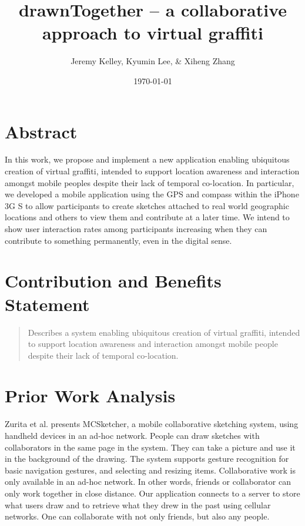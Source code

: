 \documentclass{article}
\begin{document}
\setlength{\parindent}{0pt}
\setlength{\parskip}{.5ex plus 0.5ex minus 0.2ex}




\title{ drawnTogether -- a collaborative approach to virtual graffiti }

\author{ Jeremy Kelley, Kyumin Lee, \& Xiheng Zhang }

\date{\today}

\maketitle

\section{ Abstract }

In this work, we propose and implement a new application enabling ubiquitous
creation of virtual graffiti, intended to support location awareness and
interaction amongst mobile peoples despite their lack of temporal co-location.
In particular, we developed a mobile application using the GPS and compass
within the iPhone 3G S to allow participants to create sketches attached to
real world geographic locations and others to view them and contribute at a
later time.  We intend to show user interaction rates among participants
increasing when they can contribute to something permanently, even in the
digital sense.

\section{ Contribution and Benefits Statement }

\begin{quote}
Describes a system enabling ubiquitous creation of virtual graffiti, intended
to support location awareness and interaction amongst mobile people despite
their lack of temporal co-location.
\end{quote}

\section{ Prior Work Analysis }

Zurita et al. \cite{sketching:zurita} presents MCSketcher, a mobile
collaborative sketching system, using handheld devices in an ad-hoc network.
People can draw sketches with collaborators in the same page in the system.
They can take a picture and use it in the background of the drawing. The system
supports gesture recognition for basic navigation gestures, and selecting and
resizing items. Collaborative work is only available in an ad-hoc network. In
other words, friends or collaborator can only work together in close distance.
Our application connects to a server to store what users draw and to retrieve
what they drew in the past using cellular networks. One can collaborate with
not only friends, but also any people.
\end{document}
